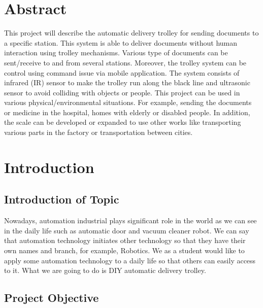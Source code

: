 \documentclass[12pt]{article}
\begin{document}
\newpage
{}

\section*{Abstract}\label{sec:abs}

\indent This project will describe the automatic delivery trolley for sending documents to a specific station. This system is able to deliver documents without human interaction using trolley mechanisms. Various type of documents can be sent/receive to and from several stations. Moreover, the trolley system can be control using command issue via mobile application. The system consists of infrared (IR) sensor to make the trolley run along the black line and ultrasonic sensor to avoid colliding with objects or people. This project can be used in various physical/environmental situations. For example, sending the documents or medicine in the hospital, homes with elderly or disabled people. In addition, the scale can be developed or expanded to use other works like transporting various parts in the factory or transportation between cities.

\newpage

\tableofcontents
\thispagestyle{empty}

\newpage
{}

\setcounter{page}{1}

\section{Introduction} \label{sec:intro}

\subsection{Introduction of Topic} \label{subsec:intro}

Nowadays, automation industrial plays significant role in the world as we can see in the daily life such as automatic door and vacuum cleaner robot. We can say that automation technology initiates other technology so that they have their own names and branch, for example, Robotics. We as a student would like to apply some automation technology to a daily life so that others can easily access to it. What we are going to do is DIY automatic delivery trolley.

\subsection{Project Objective} \label{subsec:project obj}
\end{document}
